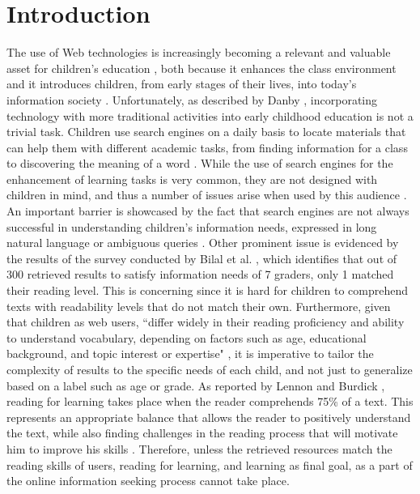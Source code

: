 \documentclass{sig-alternate-05-2015}
\begin{document}
%
%

%
%

\printccsdesc



\section{Introduction}
The use of Web technologies is increasingly becoming a relevant and valuable asset for children's education \cite{Kni14}, both because it enhances the class environment and it introduces children, from early stages of their lives, into today's information society \cite{Sad12}. Unfortunately, as described by Danby \cite{Dan13}, incorporating technology with more traditional activities into early childhood education is not a trivial task. Children use search engines on a daily basis to locate materials that can help them with different academic tasks, from finding information for a class to discovering the meaning of a word \cite{Kni14}. While the use of search engines for the enhancement of learning tasks is very common, they are not designed with children in mind, and thus a number of issues arise when used by this audience \cite{Gos13}. An important barrier is showcased by the fact that search engines are not always successful in understanding children's information needs, expressed in long natural language or ambiguous queries \cite{Bil13}. Other  prominent issue is evidenced by the results of the survey conducted by Bilal et al. \cite{Bil13}, which identifies that out of 300 retrieved results to satisfy information needs of 7 graders, only 1 matched their reading level. This is concerning since it is hard for children to comprehend texts with readability levels that do not match their own. Furthermore, given that children as web users, ``differ widely in their reading proficiency and ability to understand vocabulary, depending on factors such as age, educational background, and topic interest or expertise" \cite{Col11}, it is imperative to tailor the complexity of results to the specific needs of each child, and not just to generalize based on a label such as age or grade. As reported by Lennon and Burdick \cite{Len04}, reading for learning takes place when the reader comprehends 75\% of a text. This represents an appropriate balance that allows the reader to positively understand the text, while also finding challenges in the reading process that will motivate him to improve his skills \cite{Len04}. Therefore, unless the retrieved resources match the reading skills of users, reading for learning, and learning as final goal, as a part of the online information seeking process cannot take place. 
\end{document}
